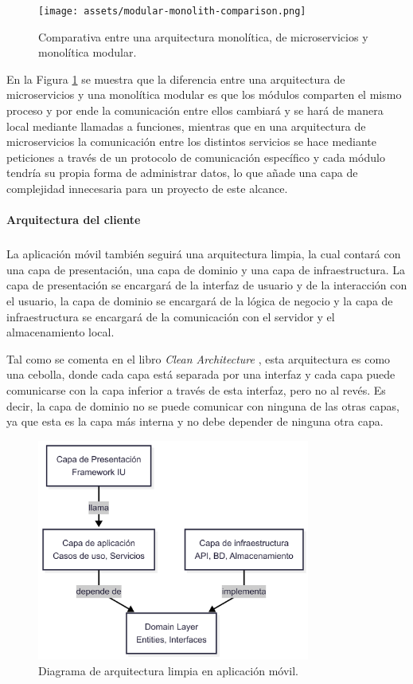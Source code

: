 \begin{figure}[H]
  \centering
  \texttt{[image: assets/modular-monolith-comparison.png]}
  \caption{Comparativa entre una arquitectura monolítica, de microservicios y monolítica modular. \parencite{tsechelidis2023modular}}
  \label{fig:modular-monolith-comparison}
\end{figure}

En la Figura \ref{fig:modular-monolith-comparison} se muestra que la diferencia entre una arquitectura de microservicios y una monolítica modular es que los módulos comparten el mismo proceso y por ende la comunicación entre ellos cambiará y se hará de manera local mediante llamadas a funciones, mientras que en una arquitectura de microservicios la comunicación entre los distintos servicios se hace mediante peticiones a través de un protocolo de comunicación específico y cada módulo tendría su propia forma de administrar datos, lo que añade una capa de complejidad innecesaria para un proyecto de este alcance.

\paragraph{Arquitectura del cliente}
\subparagraph{}
La aplicación móvil también seguirá una arquitectura limpia, la cual contará con una capa de presentación, una capa de dominio y una capa de infraestructura.
La capa de presentación se encargará de la interfaz de usuario y de la interacción con el usuario, la capa de dominio se encargará de la lógica de negocio y la capa de infraestructura se encargará de la comunicación con el servidor y el almacenamiento local.

Tal como se comenta en el libro \textit{Clean Architecture} \parencite{uncle-bob-clean-architecture}, esta arquitectura es como una cebolla, donde cada capa está separada por una interfaz y cada capa puede comunicarse con la capa inferior a través de esta interfaz, pero no al revés.
Es decir, la capa de dominio no se puede comunicar con ninguna de las otras capas, ya que esta es la capa más interna y no debe depender de ninguna otra capa.


\begin{figure}[H]
  \centering
  \includegraphics[width=0.8\textwidth]{assets/clean-architecture-mobile.png}
  \caption{Diagrama de arquitectura limpia en aplicación móvil.}
  \label{fig:clean-architecture-mobile}
\end{figure}

